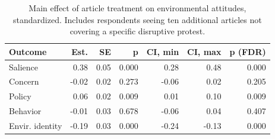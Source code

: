 \begin{table}[h!t]
\centering
\begin{tabular}{lrrrrrr}
  \hline
Outcome & Est. & SE & p & CI, min & CI, max & p (FDR) \\ 
  \hline
Salience & 0.38 & 0.05 & 0.000 & 0.28 & 0.48 & 0.000 \\ 
  Concern & -0.02 & 0.02 & 0.273 & -0.06 & 0.02 & 0.205 \\ 
  Policy & 0.06 & 0.02 & 0.009 & 0.01 & 0.10 & 0.009 \\ 
  Behavior & -0.01 & 0.03 & 0.678 & -0.06 & 0.04 & 0.407 \\ 
  Envir. identity & -0.19 & 0.03 & 0.000 & -0.24 & -0.13 & 0.000 \\ 
   \hline
\end{tabular}
\caption{Main effect of article treatment on environmental attitudes, standardized.
                   Includes respondents seeing ten additional articles not covering a specific
                   disruptive protest.} 
\label{tab:main_nonspec}
\end{table}
